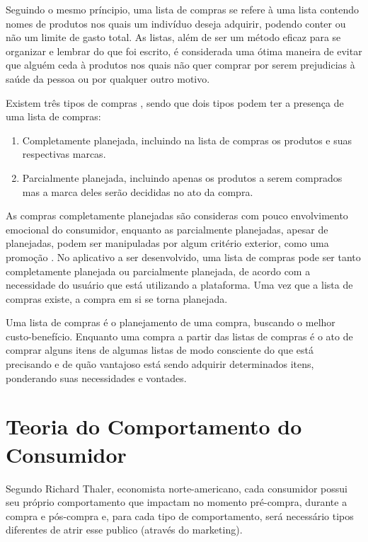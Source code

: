 Seguindo o mesmo príncipio, uma lista de compras se refere à uma lista contendo nomes de produtos nos quais um indivíduo deseja adquirir, podendo conter ou não um limite de gasto total. As listas, além de ser um método eficaz para se organizar e lembrar do que foi escrito, é considerada uma ótima maneira de evitar que alguém ceda à produtos nos quais não quer comprar por serem prejudicias à saúde da pessoa \cite{GroceryList} ou por qualquer outro motivo.

Existem três tipos de compras \cite{ComprasNaoPlanejadas}, sendo que dois tipos podem ter a presença de uma lista de compras:
\begin{enumerate}
\item Completamente planejada, incluindo na lista de compras os produtos e suas respectivas marcas.
\item Parcialmente planejada, incluindo apenas os produtos a serem comprados mas a marca deles serão decididas no ato da compra.
\end{enumerate}

As compras completamente planejadas são consideras com pouco envolvimento emocional do consumidor, enquanto as parcialmente planejadas, apesar de planejadas, podem ser manipuladas por algum critério exterior, como uma promoção \cite{ComprasNaoPlanejadas}. No aplicativo a ser desenvolvido, uma lista de compras pode ser tanto completamente planejada ou parcialmente planejada, de acordo com a necessidade do usuário que está utilizando a plataforma. Uma vez que a lista de compras existe, a compra em si se torna planejada.

Uma lista de compras é o planejamento de uma compra, buscando o melhor custo-benefício. Enquanto uma compra a partir das listas de compras é o ato de comprar alguns itens de algumas listas de modo consciente do que está precisando e de quão vantajoso está sendo adquirir determinados itens, ponderando suas necessidades e vontades.

\section{Teoria do Comportamento do Consumidor}

Segundo Richard Thaler, economista norte-americano, cada consumidor possui seu próprio comportamento que impactam no momento pré-compra, durante a compra e pós-compra e, para cada tipo de comportamento, será necessário tipos diferentes de atrir esse publico (através do marketing). 

